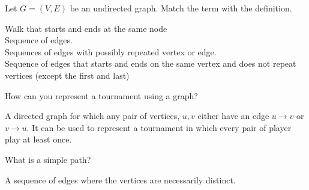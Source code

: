\question Let $G=(V, E)$ be an undirected graph. Match the term with the definition. \newline
\noindent{}


\begin{solution}
  Walk that starts and ends at the same node \\
  Sequence of edges. \\
  Sequences of edges with possibly repeated vertex or edge.\\
  Sequence of edges that starts and ends on the same vertex and 
does not repeat vertices (except the first and last)
\end{solution}

\question  How can you represent a tournament using a graph?
\begin{solution}[1 in]
A directed graph for which any pair of vertices, $u, v$ either have an edge $u \rightarrow v$ or $v \rightarrow u$. It can be used to represent a tournament in which every pair of player play at least once.
\end{solution}

\question  What is a simple path?
\begin{solution}[1 in]
A sequence of edges where the vertices are necessarily distinct.
\end{solution}